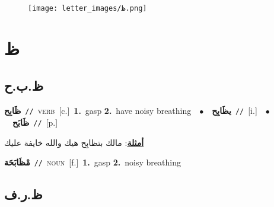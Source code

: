 \documentclass[10pt,a4paper,twoside]{article} %
\begin{document}
\begin{figure*}[t!]\centering\texttt{[image: letter\_images/ظ.png]}\end{figure*}
\color{white}

 \section*{\foreignlanguage{arabic}{ظ}} 
 \begin{multicols}{2} 

%
\color{black}
\vspace{-3mm}
\subsection*{\color{blue}\foreignlanguage{arabic}{ظ.ب.ح}\color{blue}{}} 

{\setlength\topsep{0pt}\textbf{\foreignlanguage{arabic}{ظَابِح}}\ {\color{gray}\texttt{//}\color{black}}\ \textsc{verb}\ [c.]\ \textbf{1.}~gasp  \textbf{2.}~have noisy breathing\ \ $\bullet$\ \ \setlength\topsep{0pt}\textbf{\foreignlanguage{arabic}{يظَابِح}}\ {\color{gray}\texttt{//}\color{black}}\ [i.]\ \ $\bullet$\ \ \setlength\topsep{0pt}\textbf{\foreignlanguage{arabic}{ظَابَح}}\ {\color{gray}\texttt{//}\color{black}}\ [p.]\  \begin{flushright}\color{gray}\foreignlanguage{arabic}{\textbf{\underline{\foreignlanguage{arabic}{أمثلة}}}: مالك بتظابِح هيك والله خايفة عليك}\end{flushright}\color{black}} \vspace{2mm}

{\setlength\topsep{0pt}\textbf{\foreignlanguage{arabic}{مْظَابَحَة}}\ {\color{gray}\texttt{//}\color{black}}\ \textsc{noun}\ [f.]\ \textbf{1.}~gasp  \textbf{2.}~noisy breathing\ 

\vspace{-3mm}
\subsection*{\color{blue}\foreignlanguage{arabic}{ظ.ر.ف}\color{blue}{}} 

}
\end{multicols}
\end{document}
